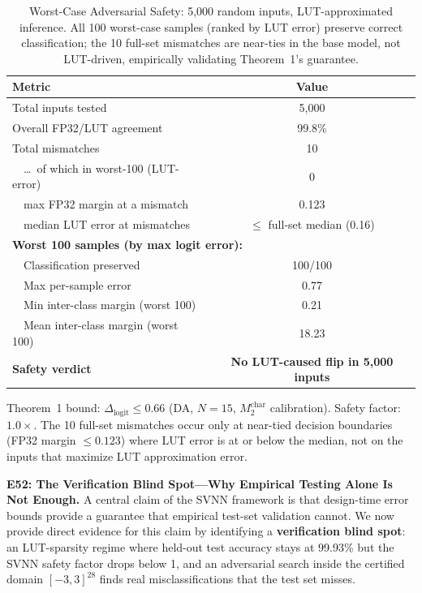 \documentclass[journal,onecolumn]{IEEEtran}
\begin{document}
\begin{table}[t]
\centering
\caption{Worst-Case Adversarial Safety: 5,000 random inputs,
LUT-approximated inference. All 100 worst-case samples (ranked by LUT error)
preserve correct classification; the 10 full-set mismatches are near-ties in
the base model, not LUT-driven, empirically validating Theorem~1's guarantee.}
\label{tab:adversarial_safety}
\small
\begin{tabular}{@{}lc@{}}
\toprule
\textbf{Metric} & \textbf{Value} \\
\midrule
Total inputs tested & 5,000 \\
Overall FP32/LUT agreement & 99.8\% \\
Total mismatches & 10 \\
~~\dots\ of which in worst-100 (LUT-error) & 0 \\
~~max FP32 margin at a mismatch & 0.123 \\
~~median LUT error at mismatches & $\leq$ full-set median (0.16) \\
\midrule
\multicolumn{2}{l}{\textbf{Worst 100 samples (by max logit error):}} \\
~~Classification preserved & 100/100 \\
~~Max per-sample error & 0.77 \\
~~Min inter-class margin (worst 100) & 0.21 \\
~~Mean inter-class margin (worst 100) & 18.23 \\
\midrule
\textbf{Safety verdict} & \textbf{No LUT-caused flip in 5,000 inputs} \\
\bottomrule
\end{tabular}
\vspace{2pt}
{\scriptsize Theorem~1 bound: $\Delta_{\text{logit}} \leq 0.66$ (DA, $N{=}15$,
$M_2^{\text{char}}$ calibration).
Safety factor: $1.0\times$. The 10 full-set mismatches occur only at near-tied
decision boundaries (FP32 margin $\leq 0.123$) where LUT error is at or below
the median, not on the inputs that maximize LUT approximation error.}
\end{table}


\vspace{4pt}
\noindent\textbf{E52: The Verification Blind Spot---Why Empirical Testing Alone Is Not Enough.}
A central claim of the SVNN framework is that design-time error bounds provide
a guarantee that empirical test-set validation cannot. We now provide direct
evidence for this claim by identifying a \textbf{verification blind spot}: an
LUT-sparsity regime where held-out test accuracy stays at 99.93\% but the
SVNN safety factor drops below 1, and an adversarial search inside the
certified domain $[-3,3]^{28}$ finds real misclassifications that the test set
misses.
\end{document}
